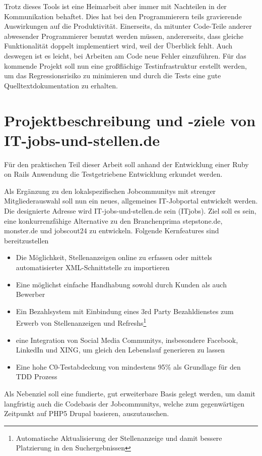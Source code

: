 Trotz dieses Tools ist eine Heimarbeit aber immer mit Nachteilen in der Kommunikation behaftet. Dies hat bei den Programmierern teils gravierende Auswirkungen auf die Produktivität. Einerseits, da mitunter Code-Teile anderer abwesender Programmierer benutzt werden müssen,  andererseits, dass gleiche Funktionalität doppelt implementiert wird, weil der Überblick fehlt. Auch deswegen ist es leicht, bei Arbeiten am Code neue Fehler einzuführen. 
Für das kommende Projekt soll nun eine großflächige Testinfrastruktur erstellt werden, um das Regressionsrisiko zu minimieren und durch die Tests eine gute Quelltextdokumentation zu erhalten.

\section{Projektbeschreibung und -ziele von IT-jobs-und-stellen.de}
Für den praktischen Teil dieser Arbeit soll anhand der Entwicklung einer Ruby on Rails Anwendung die Testgetriebene Entwicklung erkundet werden.

Als Ergänzung zu den lokalspezifischen Jobcommunitys mit strenger Mitgliederauswahl soll nun ein neues, allgemeines IT-Jobportal entwickelt werden. Die designierte Adresse wird IT-jobs-und-stellen.de sein (ITjobs).
Ziel soll es sein, eine konkurrenzfähige Alternative zu den Branchenprima stepstone.de, monster.de und jobscout24 zu entwickeln. Folgende Kernfeatures sind bereitzustellen
\begin{itemize}
 \item Die Möglichkeit, Stellenanzeigen online zu erfassen oder mittels automatisierter XML-Schnittstelle zu importieren
 \item Eine möglichst einfache Handhabung sowohl durch Kunden als auch Bewerber
 \item Ein Bezahlsystem mit Einbindung eines 3rd Party Bezahldienstes zum Erwerb von Stellenanzeigen und Refreshs\footnote{Automatische Aktualisierung der Stellenanzeige und damit bessere Platzierung in den Suchergebnissen}
 \item eine Integration von Social Media Communitys, insbesondere Facebook, LinkedIn und XING, um gleich den Lebenslauf generieren zu lassen
 \item Eine hohe C0-Testabdeckung von mindestens 95\% als Grundlage für den TDD Prozess
\end{itemize}

Als Nebenziel soll eine fundierte, gut erweiterbare Basis gelegt werden, um damit langfristig auch die Codebasis der Jobcommunitys, welche zum gegenwärtigen Zeitpunkt auf PHP5 Drupal basieren, auszutauschen.

